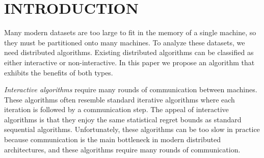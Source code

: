 \documentclass[twoside]{article}
\begin{document}
%

%



\begin{abstract}
\end{abstract}




\section{INTRODUCTION}

Many modern datasets are too large to fit in the memory of a single machine,
so they must be partitioned onto many machines.
To analyze these datasets, we need distributed algorithms.
Existing distributed algorithms can be classified as either interactive or non-interactive.
In this paper we propose an algorithm that exhibits the benefits of both types.

\emph{Interactive algorithms} require many rounds of communication between machines.
These algorithms often resemble standard iterative algorithms where each iteration is followed by a communication step.
The appeal of interactive algorithms is that they enjoy the same statistical regret bounds as standard sequential algorithms.
Unfortunately, these algorithms can be too slow in practice because communication is the main bottleneck in modern distributed architectures,
and these algorithms require many rounds of communication.
\end{document}
